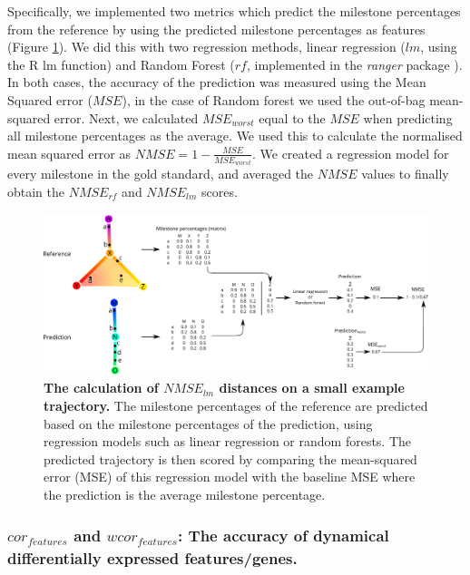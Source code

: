 Specifically, we implemented two metrics which predict the milestone percentages from the reference by using the predicted milestone percentages as features (Figure \ref{fig:snote1fig_7}). We did this with two regression methods, linear regression ($\textit{lm}$, using the R lm function) and Random Forest ($\textit{rf}$, implemented in the \textit{ranger} package  \cite{wright_rangerfastimplementation_2017}). In both cases, the accuracy of the prediction was measured using the Mean Squared error ($\mathit{MSE}$), in the case of Random forest we used the out-of-bag mean-squared error. Next, we calculated $\mathit{MSE}_{worst}$ equal to the $\mathit{MSE}$ when predicting all milestone percentages as the average. We used this to calculate the normalised mean squared error as $\mathit{NMSE} = 1 - \frac{\mathit{MSE}}{\mathit{MSE}_{worst}}$. We created a regression model for every milestone in the gold standard, and averaged the $\mathit{NMSE}$ values to finally obtain the $\textit{NMSE}_{\textit{rf}}$ and $\textit{NMSE}_{\textit{lm}}$ scores.

\begin{figure}
	\centering\includegraphics[width=\linewidth]{fig/dynbenchmark/snote1fig_7.pdf}
	\caption{
		\textbf{The calculation of $\textit{NMSE}_{\textit{lm}}$ distances on a small example trajectory.} 
		The milestone percentages of the reference are predicted based on the milestone percentages of the prediction, using regression models such as linear regression or random forests. The predicted trajectory is then scored by comparing the mean-squared error (MSE) of this regression model with the baseline MSE where the prediction is the average milestone percentage.
	}
	\label{fig:snote1fig_7}
\end{figure}

\subsubsection{$\textit{cor}_{\textit{features}}$ and $\textit{wcor}_{\textit{features}}$: The accuracy of dynamical differentially expressed features/genes.}

